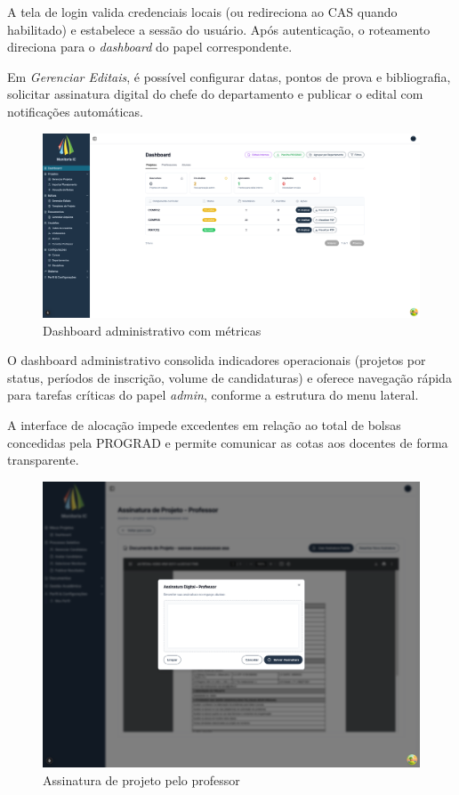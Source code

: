 \documentclass[portuguese]{sbc2025}%
\begin{document}
A tela de login valida credenciais locais (ou redireciona ao CAS quando habilitado) e estabelece a sessão do usuário. Após autenticação, o roteamento direciona para o \textit{dashboard} do papel correspondente.

Em \textit{Gerenciar Editais}, é possível configurar datas, pontos de prova e bibliografia, solicitar assinatura digital do chefe do departamento e publicar o edital com notificações automáticas.

\begin{figure}[h!]
  \centering
  \includegraphics[width=\linewidth]{images/monitoria/admin-dashboard.png}
  \caption{Dashboard administrativo com métricas}
  \label{fig:dashboard}
\end{figure}

O dashboard administrativo consolida indicadores operacionais (projetos por status, períodos de inscrição, volume de candidaturas) e oferece navegação rápida para tarefas críticas do papel \textit{admin}, conforme a estrutura do menu lateral.

A interface de alocação impede excedentes em relação ao total de bolsas concedidas pela PROGRAD e permite comunicar as cotas aos docentes de forma transparente.

\begin{figure}[h!]
  \centering
  \includegraphics[width=\linewidth]{images/monitoria/professor-assinatura-documentos.png}
  \caption{Assinatura de projeto pelo professor}
  \label{fig:professor-assinatura}
\end{figure}
\end{document}
